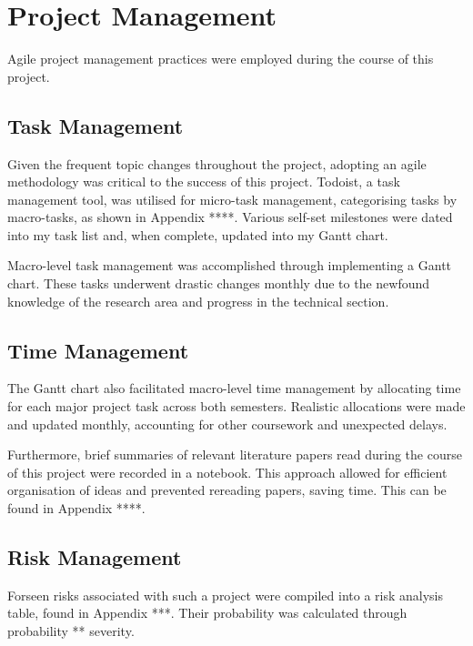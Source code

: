 

\section {Project Management}

Agile project management practices were employed during the course of this project. 

\subsection{Task Management}

Given the frequent topic changes throughout the project, adopting an agile methodology was critical to the success of this project. Todoist, a task management tool, was utilised for micro-task management, categorising tasks by macro-tasks, as shown in Appendix ****. Various self-set milestones were dated into my task list and, when complete, updated into my Gantt chart.

Macro-level task management was accomplished through implementing a Gantt chart. These tasks underwent drastic changes monthly due to the newfound knowledge of the research area and progress in the technical section. 

\subsection{Time Management}

The Gantt chart also facilitated macro-level time management by allocating time for each major project task across both semesters. Realistic allocations were made and updated monthly, accounting for other coursework and unexpected delays. 

Furthermore, brief summaries of relevant literature papers read during the course of this project were recorded in a notebook. This approach allowed for efficient organisation of ideas and prevented rereading papers, saving time. This can be found in Appendix ****.

\subsection{Risk Management}

Forseen risks associated with such a project were compiled into a risk analysis table, found in Appendix ***. Their probability was calculated through probability ** severity.

